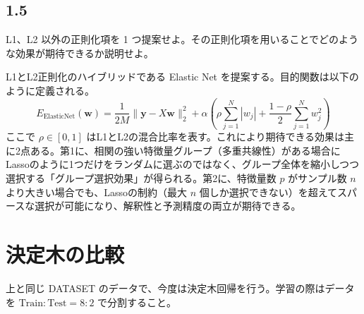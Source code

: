 \documentclass[11pt,a4paper,dvipdfmx]{article}
\numberwithin{equation}{section}
\newenvironment{note}[0]
{
    \begin{tcolorbox}[sharp corners, colframe=gray!20, colback=gray!20, width=\textwidth]
}
{
    \end{tcolorbox}
}
\begin{document}
\subsection*{1.5}
\begin{note}
L1、L2 以外の正則化項を 1 つ提案せよ。その正則化項を用いることでどのような効果が期待できるか説明せよ。
\end{note}
\begin{proofbox}
L1とL2正則化のハイブリッドである Elastic Net を提案する。目的関数は以下のように定義される。
\begin{equation}
E_{\text{ElasticNet}}(\bm{w}) = \frac{1}{2M} \|\bm{y} - X\bm{w}\|_2^2 + \alpha \left( \rho \sum_{j=1}^N |w_j| + \frac{1-\rho}{2} \sum_{j=1}^N w_j^2 \right)
\end{equation}
ここで $\rho \in [0, 1]$ はL1とL2の混合比率を表す。これにより期待できる効果は主に2点ある。第1に、相関の強い特徴量グループ（多重共線性）がある場合にLassoのように1つだけをランダムに選ぶのではなく、グループ全体を縮小しつつ選択する「グループ選択効果」が得られる。第2に、特徴量数 $p$ がサンプル数 $n$ より大きい場合でも、Lassoの制約（最大 $n$ 個しか選択できない）を超えてスパースな選択が可能になり、解釈性と予測精度の両立が期待できる。
\end{proofbox}


\section{決定木の比較}
\begin{note}
上と同じ DATASET のデータで、今度は決定木回帰を行う。学習の際はデータを $\text{Train}:\text{Test}= 8 : 2$ で分割すること。
\end{note}
\end{document}
